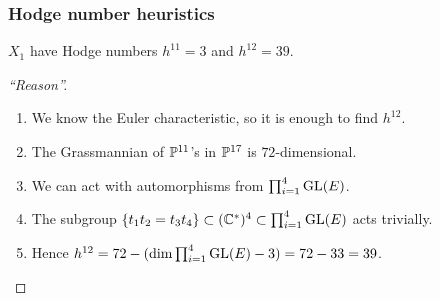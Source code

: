 \begin{frame}
\frametitle{Hodge number heuristics}
\begin{conjecture}
$X_1$ have Hodge numbers $h^{11}=3$ and $h^{12}=39$.
\end{conjecture}
\begin{proof}[``Reason'']

\begin{enumerate}
	\item We know the Euler characteristic, so it is enough to find $h^{12}$.
	\item The Grassmannian of $\P^{11}$'s in $\P^{17}$ is $72$-dimensional.
	\item We can act with automorphisms from $\prod_{i=1}^4 \GL(E)$.
	\item The subgroup $\{ t_1t_2=t_3t_4 \} \subset (\C^\ast)^4 \subset \prod_{i=1}^4 \GL(E)$ acts trivially.
	\item Hence $h^{12}=72-(\dim \prod_{i=1}^4 \GL(E) - 3) = 72-33=39$.
\end{enumerate}

\end{proof}


\end{frame}